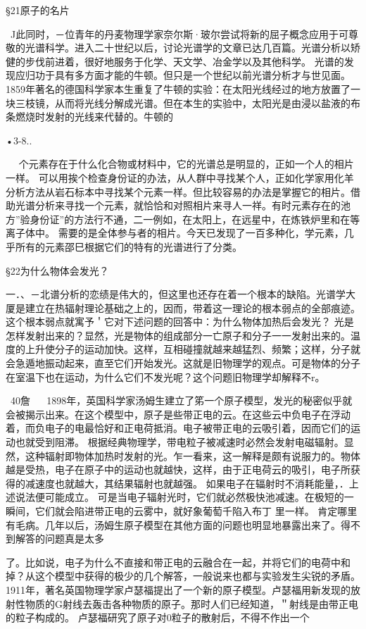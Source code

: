 §21原子的名片

~J此同时，－位青年的丹麦物理学家奈尔斯·玻尔尝试将新的屈子概念应用于可尊敬的光谱科学。进入二十世纪以后，讨论光谱学的文章已达几百篇。光谱分析以矫健的步伐前进着，很好地服务于化学、天文学、冶金学以及其他科学。
光谱的发现应归功于具有多方面才能的牛顿。但只是一个世纪以前光谱分析才与世见面。1859年著名的德国科学家本生重复了牛顿的实验：在太阳光线经过的地方放置了一块三枝镜，从而将光线分解成光谱。但在本生的实验中，太阳光是由浸以盐液的布条燃烧时发射的光线来代替的。牛顿的

•3-8..
  



  
个元素存在于什么化合物或材料中，它的光谱总是明显的，正如一个人的相片一样。
可以用挨个检查身份证的办法，从人群中寻找某个人，正如化学家用化羊分析方法从岩石标本中寻找某个元素一样。但比较容易的办法是掌握它的相片。借助光谱分析来寻找一个元素，就恰恰和对照相片来寻人一祥。有时元素存在的池方”验身份证”的方法行不通，二一例如，在太阳上，在远星中，在炼铁炉里和在等离子体中。
需要的是全体参与者的相片。今天已发现了一百多种化，学元素，几乎所有的元素邵巳根据它们的特有的光谱进行了分类。

§22为什么物体会发光？

一．、－北谱分析的恋绩是伟大的，但这里也还存在着一个根本的缺陷。光谱学大厦是建立在热辐射理论基础之上的，因而，带着这一理论的根本弱点的全部痕迹。这个根本弱点就寓予＇它对下述问题的回答中：为什么物体加热后会发光？
光是怎样发射出来的？显然，光是物体的组成部分一亡原子和分子一一发射出来的。温度的上升使分子的运动加快。这样，互相碰撞就越来越猛烈、频繁；这样，分子就会急遁地振动起来，直至它们开始发光。这就是旧物理学的观点。可是物体的分子在室温下也在运动，为什么它们不发光呢？这个问题旧物理学却解释不r。

~40詹
  
1898年，英国科学家汤姆生建立了笫一个原子模型，发光的秘密似乎就会被揭示出来。在这个模型中，原子是些带正电的云。在这些云中负电子在浮动着，而负电子的电最恰好和正电荷抵消。电子被带正电的云吸引着，因而它们的运动也就受到阻滞。
根据经典物理学，带电粒子被减速时必然会发射电磁辐射。显然，这种辐射即物体加热时发射的光。乍一看来，这一解释是颇有说服力的。物体越是受热，电子在原子中的运动也就越快，这样，由于正电荷云的吸引，电子所获得的减速度也就越大，其结果辐射也就越强。
如果电子在辐射时不消耗能量，．上述说法便可能成立。
可是当电子辐射光时，它们就必然极快池减速。在极短的一瞬间，它们就会陷进带正电的云雾中，就好象葡萄千陷入布丁
里一样。
肯定哪里有毛病。几年以后，汤姆生原子模型在其他方面的问题也明显地暴露出来了。得不到解答的问题真是太多

了。比如说，电子为什么不直接和带正电的云融合在一起，并将它们的电荷中和掉？从这个模型中获得的极少的几个解答，一般说来也都与实验发生尖锐的矛盾。
1911年，著名英国物理学家卢瑟福提出了一个新的原子模型。卢瑟福用新发现的放射性物质的G射线去轰击各种物质的原子。那时人们已经知道，＂射线是由带正电的粒子构成的。
卢瑟福研究了原子对0粒子的散射后，不得不作出一个

